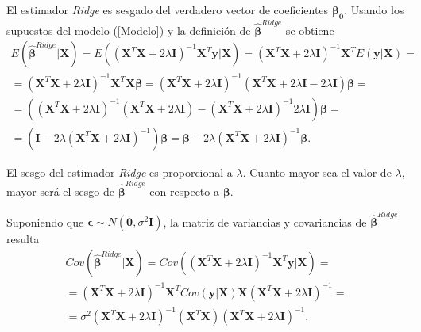 \documentclass[a4paper,12pt]{report}
\begin{document}
El estimador \textit{Ridge} es sesgado del verdadero vector de coeficientes $\boldsymbol{\beta_0}$. Usando los supuestos del modelo (\ref{Modelo}) y la definición de $\boldsymbol{\hat{\beta}}^{Ridge}$ se obtiene 
\begin{gather}
\nonumber
E\left(\boldsymbol{\hat{\beta}}^{Ridge}|\boldsymbol{X}\right)=E\left((\boldsymbol{X}^T\boldsymbol{X}+2\lambda \boldsymbol{I})^{-1}\boldsymbol{X}^T\boldsymbol{y}|\boldsymbol{X}\right)=(\boldsymbol{X}^T\boldsymbol{X}+2\lambda \boldsymbol{I})^{-1}\boldsymbol{X}^TE(\boldsymbol{y}|\boldsymbol{X})= \\
\nonumber
=(\boldsymbol{X}^T\boldsymbol{X}+2\lambda \boldsymbol{I})^{-1}\boldsymbol{X}^T\boldsymbol{X}\boldsymbol{\beta}=(\boldsymbol{X}^T\boldsymbol{X}+2\lambda \boldsymbol{I})^{-1}(\boldsymbol{X}^T\boldsymbol{X}+2\lambda \boldsymbol{I}-2\lambda \boldsymbol{I})\boldsymbol{\beta}= \\
\nonumber
=\left( (\boldsymbol{X}^T\boldsymbol{X}+2\lambda \boldsymbol{I})^{-1}(\boldsymbol{X}^T\boldsymbol{X}+2\lambda \boldsymbol{I})-(\boldsymbol{X}^T\boldsymbol{X}+2\lambda \boldsymbol{I})^{-1}2\lambda \boldsymbol{I} \right) \boldsymbol{\beta}=\\
=\left( \boldsymbol{I}-2\lambda (\boldsymbol{X}^T\boldsymbol{X}+2\lambda \boldsymbol{I})^{-1} \right) \boldsymbol{\beta}= \boldsymbol{\beta}-2\lambda (\boldsymbol{X}^T\boldsymbol{X}+2\lambda \boldsymbol{I})^{-1}\boldsymbol{\beta}.
\end{gather}

El sesgo del estimador \textit{Ridge} es proporcional a $\lambda$. Cuanto mayor sea el valor de $\lambda$, mayor será el sesgo de $\boldsymbol{\hat{\beta}}^{Ridge}$ con respecto a $\boldsymbol{\beta}$.

Suponiendo que $\boldsymbol{\epsilon} \sim N(\boldsymbol{0}, \sigma^2 \boldsymbol{I})$, la matriz de variancias y covariancias de $\boldsymbol{\hat{\beta}}^{Ridge}$ resulta
\begin{gather}
\nonumber
Cov\left(\boldsymbol{\hat{\beta}}^{Ridge}|\boldsymbol{X}\right)=Cov\left((\boldsymbol{X}^T\boldsymbol{X}+2\lambda \boldsymbol{I})^{-1}\boldsymbol{X}^T\boldsymbol{y}|\boldsymbol{X}\right)= \\
\nonumber
=(\boldsymbol{X}^T\boldsymbol{X}+2\lambda \boldsymbol{I})^{-1}\boldsymbol{X}^TCov(\boldsymbol{y}|\boldsymbol{X})\boldsymbol{X}(\boldsymbol{X}^T\boldsymbol{X}+2\lambda \boldsymbol{I})^{-1}= \\
\label{COV_BETA_RIDGE}
=\sigma^2(\boldsymbol{X}^T\boldsymbol{X}+2\lambda \boldsymbol{I})^{-1}(\boldsymbol{X}^T\boldsymbol{X})(\boldsymbol{X}^T\boldsymbol{X}+2\lambda \boldsymbol{I})^{-1}.
\end{gather}
\end{document}
